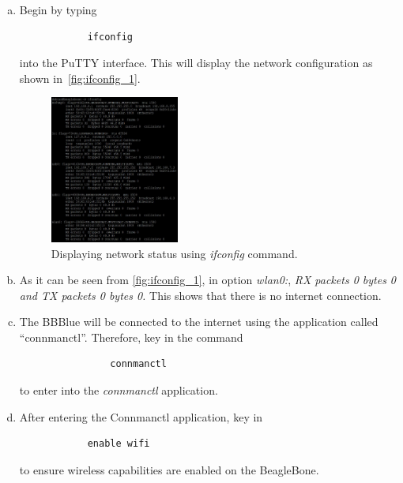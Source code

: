 \begin{enumerate}[a)]
    \item Begin by typing 
         \begin{verbatim}
            ifconfig
         \end{verbatim}
         into the PuTTY interface. This will display the network configuration as shown in~\autoref{fig:ifconfig_1}. 
         
    \begin{figure}
        \centering
        \includegraphics[width= 0.4\textwidth]{figs/img/Lab0/ifconfig_1.JPG}
        \caption{Displaying network status using \emph{ifconfig} command.}
        \label{fig:ifconfig_1}
    \end{figure} 

    \item As it can be seen from \autoref{fig:ifconfig_1}, in option \emph{wlan0:},
    \emph{RX packets 0 bytes 0 and TX packets 0 bytes 0.} This shows that there is
    no internet connection.

    
    \item The BBBlue will be connected to the internet using the application called
    ``connmanctl''. Therefore, key in the command
            \begin{verbatim}
                connmanctl
            \end{verbatim}
        to enter into the \emph{connmanctl} application.
    
    \item After entering the Connmanctl application, key in
        \begin{verbatim}
            enable wifi
        \end{verbatim}
    to ensure wireless capabilities are enabled on the BeagleBone.
    

\end{enumerate}
